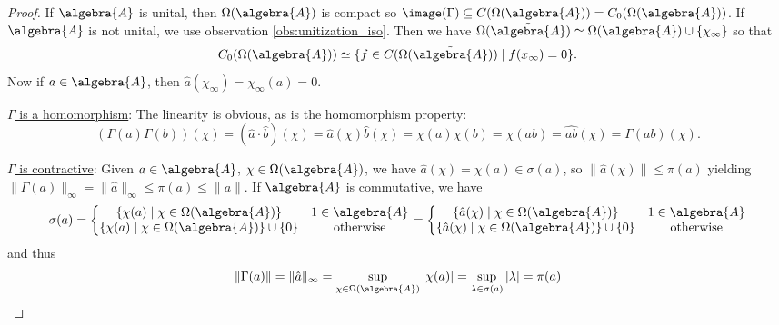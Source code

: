 \documentclass[a4paper]{article}
\begin{document}
\begin{proof}
	If $\algebra{A}$ is unital, then $\Omega(\algebra{A})$ is compact so $\image(\Gamma) \subseteq C(\Omega(\algebra{A})) = C_0(\Omega(\algebra{A}))$. If $\algebra{A}$ is not unital, we use observation \ref{obs:unitization_iso}. Then we have $\Omega(\tilde{\algebra{A}}) \simeq \Omega(\algebra{A}) \cup \{\chi_\infty\}$ so that
	\begin{equation*}
		C_0(\Omega(\algebra{A})) \simeq \{ f \in C(\Omega(\tilde{\algebra{A}})) \mid f(x_\infty) = 0 \}\text{.}
	\end{equation*}
	Now if $a \in \algebra{A}$, then $\hat a (\chi_\infty) = \chi_\infty(a) = 0$.

	\underline{$\Gamma$ is a homomorphism}: The linearity is obvious, as is the homomorphism property:
	\begin{equation*}
		(\Gamma(a) \Gamma(b))(\chi) = (\hat a \cdot \hat b)(\chi) = \hat a(\chi) \hat b (\chi) = \chi(a) \chi(b) = \chi(ab) = \hat{ab} (\chi) = \Gamma(ab)(\chi)\text{.}
	\end{equation*}

	\underline{$\Gamma$ is contractive}: Given $a \in \algebra{A}$, $\chi \in \Omega(\algebra{A})$, we have $\hat a (\chi) = \chi(a) \in \sigma(a)$, so $\|\hat a (\chi) \| \leq \pi(a)$ yielding $\|\Gamma(a)\|_\infty = \|\hat a\|_\infty \leq \pi(a) \leq \|a\|$. If $\algebra{A}$ is commutative, we have
	\begin{equation*}
		\sigma(a) = \left\{ \begin{matrix}
			\{\chi(a) \mid \chi \in \Omega(\algebra{A}) \}             & 1 \in \algebra{A} \\
			\{\chi(a) \mid \chi \in \Omega(\algebra{A}) \} \cup \{0 \} & \text{otherwise}
		\end{matrix} \right. = \left\{ \begin{matrix}
			\{ \hat a(\chi) \mid \chi \in \Omega(\algebra{A}) \}            & 1 \in \algebra{A} \\
			\{ \hat a(\chi) \mid \chi \in \Omega(\algebra{A}) \} \cup \{0\} & \text{otherwise}
		\end{matrix} \right.
	\end{equation*}
	and thus
	\begin{equation*}
		\|\Gamma(a)\| = \|\hat a \|_\infty = \sup_{\chi \in \Omega(\algebra{A})} | \chi(a) | = \sup_{\lambda \in \sigma(a)} |\lambda| = \pi(a)
	\end{equation*}
\end{proof}
\end{document}

